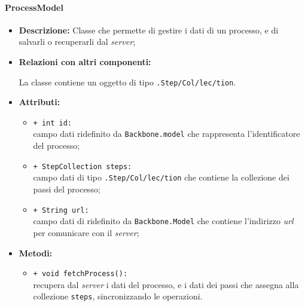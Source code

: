 \paragraph{ProcessModel}
\label{processModel}
\begin{flushleft}
\begin{itemize}
\item \textbf{Descrizione:} Classe che permette di gestire i dati di un processo, e di salvarli o recuperarli dal \textit{server};
\item \textbf{Relazioni con altri componenti:}
\begin{sloppypar}
La classe contiene un oggetto di tipo \texttt{\collection{}.Step\fshyp{}Col\fshyp{}lec\fshyp{}tion}.
\end{sloppypar}
\item \textbf{Attributi:}
\begin{sloppypar}
\begin{itemize}
\item \texttt{+ int id:}\\ campo dati ridefinito da \texttt{Backbone.model} che rappresenta l'identificatore del processo;
\item \texttt{+ StepCollection steps:}\\ campo dati di tipo \texttt{\collection{}.Step\fshyp{}Col\fshyp{}lec\fshyp{}tion} che contiene la collezione dei passi del processo;
\item \texttt{+ String url:}\\ campo dati di ridefinito da \texttt{Backbone.Model} che contiene l'indirizzo \textit{url} per comunicare con il \textit{server};
\end{itemize}
\end{sloppypar}
\item \textbf{Metodi:}
\begin{sloppypar}
\begin{itemize}
\item \texttt{+ void fetchProcess():}\\ recupera dal \textit{server} i dati del processo, e i dati dei passi che assegna alla collezione \texttt{steps}, sincronizzando le operazioni.
\end{itemize}
\end{sloppypar}
\end{itemize}
\end{flushleft}

